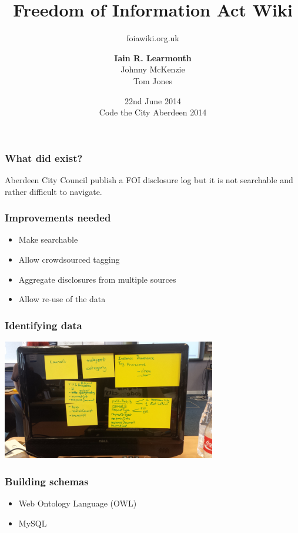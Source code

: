 \documentclass{beamer}
\title{Freedom of Information Act Wiki}
\subtitle{foiawiki.org.uk}
\author[Presenter: Iain R. Learmonth]{{\bf Iain R. Learmonth} \\ Johnny McKenzie \\ Tom Jones}
\date[22nd June 2014]{22nd June 2014 \\ Code the City Aberdeen 2014}
\begin{document}
\begin{frame}
\maketitle
\end{frame}

\begin{frame}
	\frametitle{What did exist?}
Aberdeen City Council publish a FOI disclosure log but it is not searchable and rather difficult to navigate.
\end{frame}

\begin{frame}
	\frametitle{Improvements needed}
	\begin{itemize}
		\item{Make searchable}
		\item{Allow crowdsourced tagging}
		\item{Aggregate disclosures from multiple sources}
		\item{Allow re-use of the data}
	\end{itemize}
\end{frame}

\begin{frame}
	\frametitle{Identifying data}
	\begin{center}
		\includegraphics[width=0.7\textwidth]{information.jpg}
	\end{center}
\end{frame}

\begin{frame}
	\frametitle{Building schemas}
	\begin{itemize}
		\item{Web Ontology Language (OWL)}
		\item{MySQL}
	\end{itemize}
\end{frame}
\end{document}

